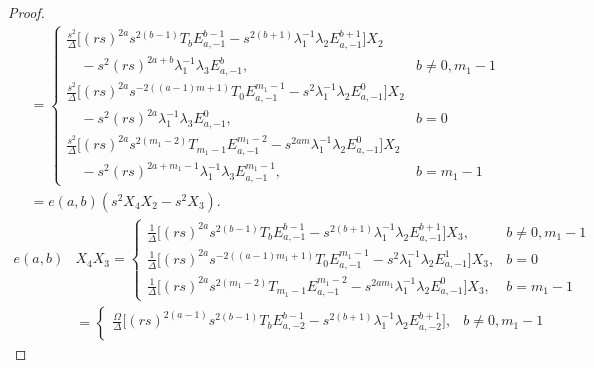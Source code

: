\documentclass[10pt,a4paper]{amsart}
\begin{document}
\begin{proof}
    \begin{align*}
   & =\begin{cases}
    \displaystyle \frac{s^2}{\Delta} \Bigg[ 
            (rs)^{2a} s^{2(b-1)} T_b  
            E^{b-1}_{a,-1}- s^{2(b+1)} \lambda_1^{-1} \lambda_2 E^{b+1}_{a,-1}\Bigg]X_2\\ \quad-s^2(rs)^{2a+b}\lambda_1^{-1}\lambda_3E^{b}_{a,-1},  
        &  b \neq 0, m_1 - 1 \\[7pt]
        \displaystyle \frac{s^2}{\Delta} \Bigg[ 
            (rs)^{2a} s^{-2((a-1)m+1)} T_0  
            E^{m_1-1}_{a,-1}- s^{2} \lambda_1^{-1} \lambda_2 E^{0}_{a,-1}\Bigg]X_2 \\ \quad-s^2(rs)^{2a}\lambda_1^{-1}\lambda_3E^{0}_{a,-1},  
        &  b = 0\\[7pt]
         \displaystyle \frac{s^2}{\Delta} \Bigg[ 
            (rs)^{2a} s^{2(m_1-2)} T_{m_1-1}  
            E^{m_1-2}_{a,-1}- s^{2am} \lambda_1^{-1} \lambda_2 E^{0}_{a,-1}\Bigg]X_2\\ \quad-s^2(rs)^{2a+m_1-1}\lambda_1^{-1}\lambda_3E^{m_1-1}_{a,-1},  
        &  b =m_1 - 1
        \end{cases}\\[7pt] &=e(a,b)(s^2X_4X_2-s^2X_3).\end{align*}
\begin{align*}
         e(a,b)&X_4X_3=\begin{cases}
        \displaystyle \frac{1}{\Delta} \Bigg[ 
            (rs)^{2a} s^{2(b-1)} T_b 
            E^{b-1}_{a,-1}- s^{2(b+1)} \lambda_1^{-1} \lambda_2 E^{b+1}_{a,-1} 
        \Bigg]X_3,  
        &  b \neq 0, m_1 - 1 \\[15pt]
\displaystyle\frac{1}{\Delta} \Bigg[ 
            (rs)^{2a} s^{-2 ((a-1) m_1+1)} 
            T_0 E^{m_1-1}_{a,-1} 
            - s^{2} \lambda_1^{-1} \lambda_2 E^{1}_{a,-1} 
        \Bigg]X_3,  
        &  b = 0 \\[15pt]
\displaystyle\frac{1}{\Delta} \Bigg[ 
            (rs)^{2a} s^{2(m_1 - 2)} T_{m_1-1}
            E^{m_1-2}_{a,-1} - s^{2 a m_1} \lambda_1^{-1} \lambda_2 E^{0}_{a,-1} 
        \Bigg] X_3,  
        & b = m_1 - 1
    \end{cases}\\[2pt]
         &=\begin{cases}
        \displaystyle \frac{\Omega}{\Delta} \Bigg[ 
            (rs)^{2(a-1)} s^{2(b-1)} T_b           E^{b-1}_{a,-2}- s^{2(b+1)} \lambda_1^{-1} \lambda_2 E^{b+1}_{a,-2} 
        \Bigg], 
        &  b \neq 0, m_1 - 1 \\[13pt]

\end{cases}
\end{align*}
\end{proof}
\end{document}
